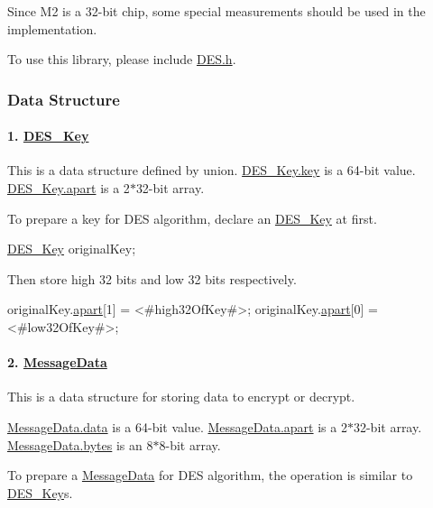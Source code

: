 Since M2 is a 32-\/bit chip, some special measurements should be used in the implementation.

To use this library, please include {\ttfamily \mbox{\hyperlink{a00005}{D\+E\+S.\+h}}}.

\subsubsection*{Data Structure}

\paragraph*{1. \mbox{\hyperlink{a00134}{D\+E\+S\+\_\+\+Key}}}

This is a data structure defined by union. \mbox{\hyperlink{a00134_a48b5dadf7decf3076826072563041f1b}{D\+E\+S\+\_\+\+Key.\+key}} is a 64-\/bit value. \mbox{\hyperlink{a00134_a3e14395e8ac22e9e775a243041daaeeb}{D\+E\+S\+\_\+\+Key.\+apart}} is a 2$\ast$32-\/bit array.

To prepare a key for D\+ES algorithm, declare an \mbox{\hyperlink{a00134}{D\+E\+S\+\_\+\+Key}} at first.


\begin{DoxyCode}
\mbox{\hyperlink{a00134}{DES\_Key}} originalKey;
\end{DoxyCode}


Then store high 32 bits and low 32 bits respectively.


\begin{DoxyCode}
originalKey.\mbox{\hyperlink{a00134_a3e14395e8ac22e9e775a243041daaeeb}{apart}}[1] = <#high32OfKey#>;
originalKey.\mbox{\hyperlink{a00134_a3e14395e8ac22e9e775a243041daaeeb}{apart}}[0] = <#low32OfKey#>;
\end{DoxyCode}


\paragraph*{2. \mbox{\hyperlink{a00138}{Message\+Data}}}

This is a data structure for storing data to encrypt or decrypt.

\mbox{\hyperlink{a00138_a2cf9dd28d0679205048930fe98fa116b}{Message\+Data.\+data}} is a 64-\/bit value. \mbox{\hyperlink{a00138_a43406dd2e72f1230b8f70551a96699c5}{Message\+Data.\+apart}} is a 2$\ast$32-\/bit array. \mbox{\hyperlink{a00138_aaceaebf6f0349dae52e2c1c2a462b654}{Message\+Data.\+bytes}} is an 8$\ast$8-\/bit array.

To prepare a \mbox{\hyperlink{a00138}{Message\+Data}} for D\+ES algorithm, the operation is similar to \mbox{\hyperlink{a00134}{D\+E\+S\+\_\+\+Key}}\textquotesingle{}s.

